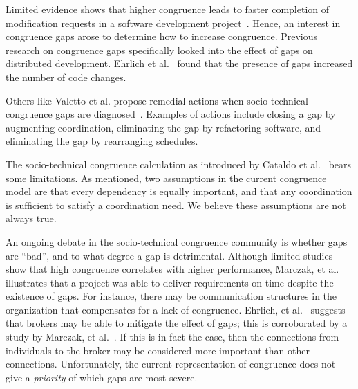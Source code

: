\documentclass[times, 10pt,twocolumn]{article}
\begin{document}


Limited evidence shows that higher congruence leads to faster completion of modification requests in a software development project~\cite{cataldo2006:coordination_reqs}.
Hence, an interest in congruence gaps arose to determine how to increase congruence. 
Previous research on congruence gaps specifically looked into the effect of gaps on distributed development. 
Ehrlich et al.~\cite{ehrlich2008:congruence_gaps} found that the presence of gaps increased the number of code changes.

Others like Valetto et al. propose remedial actions when socio-technical congruence gaps are diagnosed~\cite{valetto2007:value}. 
Examples of actions include closing a gap by augmenting coordination, eliminating the gap by refactoring software, and eliminating the gap by rearranging schedules.




The socio-technical congruence calculation as introduced by Cataldo et al.~\cite{cataldo2006:coordination_reqs} bears some limitations. As mentioned, two assumptions in the current congruence model are that every dependency is equally important, and that any coordination is sufficient to satisfy a coordination need. 
We believe these assumptions are not always true.

An ongoing debate in the socio-technical congruence community is whether  gaps are ``bad'', and to what degree a gap is detrimental. 
Although limited studies show that high congruence correlates with higher performance, Marczak, et al.~\cite{marczak2008:brokers} illustrates that a project was able to deliver requirements on time despite the existence of gaps. 
For instance, there may be communication structures in the organization that compensates for a lack of congruence.
Ehrlich, et al.~\cite{ehrlich2008:congruence_gaps} suggests that brokers may be able to mitigate the effect of gaps; this is corroborated by a study by Marczak, et al.~\cite{marczak2008:brokers}.
If this is in fact the case, then the connections from individuals to the broker may be considered more important than other connections.
Unfortunately, the current representation of congruence does not give a \emph{priority} of which gaps are most severe.
\end{document}
